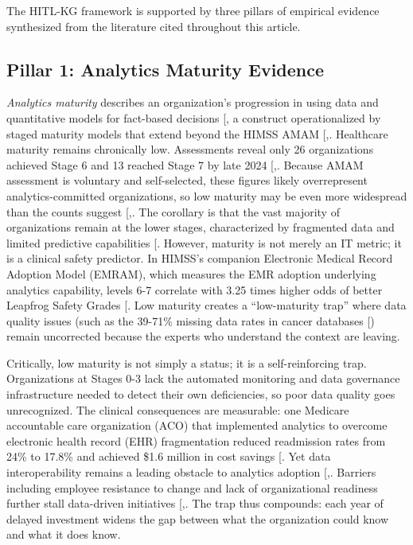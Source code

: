 \documentclass[
  american,
  11pt,
  letterpaper,
  oneside  ,captions=tableheading
]{scrartcl}
\begin{document}
The HITL-KG framework is supported by three pillars of empirical
evidence synthesized from the literature cited throughout this article.

\subsection{Pillar 1: Analytics Maturity
Evidence}\label{pillar-1-analytics-maturity-evidence}

\emph{Analytics maturity} describes an organization's progression in
using data and quantitative models for fact-based decisions
{[}\citeproc{ref-davenport2007}{39}{]}, a construct operationalized by
staged maturity models that extend beyond the HIMSS AMAM
{[},\citeproc{ref-langer2025}{41}{]}.
Healthcare maturity remains chronically low. Assessments reveal only 26
organizations achieved Stage 6 and 13 reached Stage 7 by late 2024
{[},\citeproc{ref-himss2024news}{2}{]}.
Because AMAM assessment is voluntary and self-selected, these figures
likely overrepresent analytics-committed organizations, so low maturity
may be even more widespread than the counts suggest
{[},\citeproc{ref-tomaskovic1994}{43}{]}.
The corollary is that the vast majority of organizations remain at the
lower stages, characterized by fragmented data and limited predictive
capabilities {[}\citeproc{ref-health2020}{44}{]}. However, maturity is
not merely an IT metric; it is a clinical safety predictor. In HIMSS's
companion Electronic Medical Record Adoption Model (EMRAM), which
measures the EMR adoption underlying analytics capability, levels 6-7
correlate with 3.25 times higher odds of better Leapfrog Safety Grades
{[}\citeproc{ref-snowdon2024}{45}{]}. Low maturity creates a
``low-maturity trap'' where data quality issues (such as the 39-71\%
missing data rates in cancer databases
{[}\citeproc{ref-yang2021}{46}{]}) remain uncorrected because the
experts who understand the context are leaving.

Critically, low maturity is not simply a status; it is a
self-reinforcing trap. Organizations at Stages 0-3 lack the automated
monitoring and data governance infrastructure needed to detect their own
deficiencies, so poor data quality goes unrecognized. The clinical
consequences are measurable: one Medicare accountable care organization
(ACO) that implemented analytics to overcome electronic health record
(EHR) fragmentation reduced readmission rates from 24\% to 17.8\% and
achieved \$1.6 million in cost savings
{[}\citeproc{ref-latrella2024}{47}{]}. Yet data interoperability remains
a leading obstacle to analytics adoption
{[},\citeproc{ref-zhang2024}{4}{]}. Barriers
including employee resistance to change and lack of organizational
readiness further stall data-driven initiatives
{[},\citeproc{ref-kamble2019}{49}{]}. The
trap thus compounds: each year of delayed investment widens the gap
between what the organization could know and what it does know.
\end{document}
